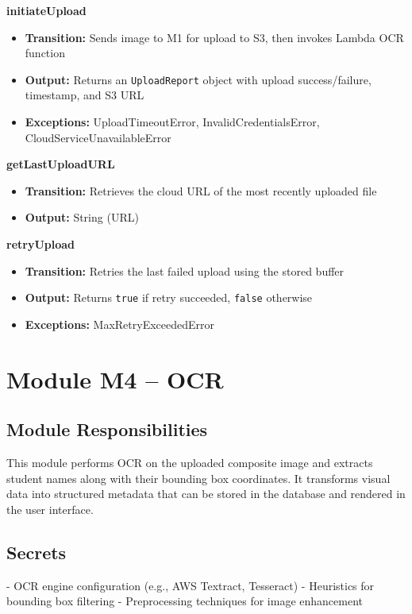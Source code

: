 \documentclass[12pt, titlepage]{article}
\begin{document}
\textbf{initiateUpload}
\begin{itemize}
  \item \textbf{Transition:} Sends image to M1 for upload to S3, then invokes Lambda OCR function
  \item \textbf{Output:} Returns an \texttt{UploadReport} object with upload success/failure, timestamp, and S3 URL
  \item \textbf{Exceptions:} UploadTimeoutError, InvalidCredentialsError, CloudServiceUnavailableError
\end{itemize}

\textbf{getLastUploadURL}
\begin{itemize}
  \item \textbf{Transition:} Retrieves the cloud URL of the most recently uploaded file
  \item \textbf{Output:} String (URL)
\end{itemize}

\textbf{retryUpload}
\begin{itemize}
  \item \textbf{Transition:} Retries the last failed upload using the stored buffer
  \item \textbf{Output:} Returns \texttt{true} if retry succeeded, \texttt{false} otherwise
  \item \textbf{Exceptions:} MaxRetryExceededError
\end{itemize}



\section{Module M4 – OCR}
\label{SecM4}

\subsection*{Module Responsibilities}
This module performs OCR on the uploaded composite image and extracts student names along with their bounding box coordinates. It transforms visual data into structured metadata that can be stored in the database and rendered in the user interface.

\subsection*{Secrets}
- OCR engine configuration (e.g., AWS Textract, Tesseract)  
- Heuristics for bounding box filtering  
- Preprocessing techniques for image enhancement
\end{document}
